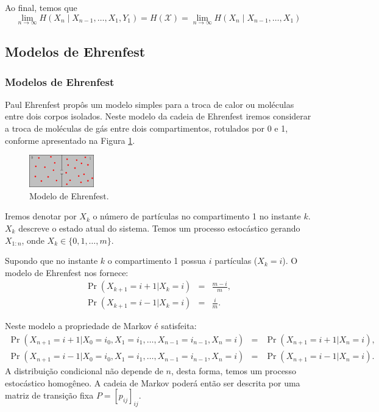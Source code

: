 \begin{frame}[allowframebreaks]
  \framebreak

  Ao final, temos que
  \begin{equation}
  \lim_{n \rightarrow \infty} H(X_n \mid X_{n-1}, \ldots, X_1, Y_1) = H(\mathcal{X}) = \lim_{n \rightarrow \infty} H(X_n \mid X_{n-1}, \ldots, X_1)
  \end{equation}
\end{frame}


\subsection{Modelos de Ehrenfest}
\begin{frame}[allowframebreaks]
  \frametitle{Modelos de Ehrenfest}

Paul Ehrenfest propôs um modelo simples para a troca de calor ou moléculas entre
dois corpos isolados. Neste modelo da cadeia de Ehrenfest iremos considerar a troca de
moléculas de gás entre dois compartimentos, rotulados por 0 e 1,
conforme apresentado na Figura \ref{fig:ehrenfes}.

\begin{figure}[h]
  \centering
  \includegraphics[width=0.25\textwidth]{images/ehrenfest.png}
  \caption{Modelo de Ehrenfest.}
  \label{fig:ehrenfes}
\end{figure}

Iremos denotar por $X_k$ o número de partículas no compartimento 1 no instante $k$.
$X_k$ descreve o estado atual do sistema. Temos um processo estocástico gerando $X_{1:n}$,
onde $X_k \in \{0,1,\ldots,m\}$.

\framebreak 

Supondo que no instante $k$ o compartimento 1 possua $i$ partículas ($X_k = i$).
O modelo de Ehrenfest nos fornece:
\begin{eqnarray}
\Pr(X_{k+1} = i+1 | X_k = i) &=& \frac{m - i}{m} , \nonumber  \\
\Pr(X_{k+1} = i-1 | X_k = i) &=& \frac{i}{m} .
\end{eqnarray}

Neste modelo a propriedade de Markov é satisfeita:
\begin{eqnarray}
\Pr(X_{n+1} = i+1 | X_0 = i_0, X_1 = i_1, \ldots, X_{n-1} = i_{n-1}, X_n = i) &=& \Pr(X_{n+1} = i+1 | X_n = i) , \nonumber \\
\Pr(X_{n+1} = i-1 | X_0 = i_0, X_1 = i_1, \ldots, X_{n-1} = i_{n-1}, X_n = i) &=& \Pr(X_{n+1} = i-1 | X_n = i) . \nonumber
\end{eqnarray}
A distribuição condicional não depende de $n$, desta forma, temos um processo estocástico homogêneo. 
A cadeia de Markov poderá então ser descrita por uma matriz de transição fixa $P = [p_{ij}]_{ij}$.


\end{frame}
